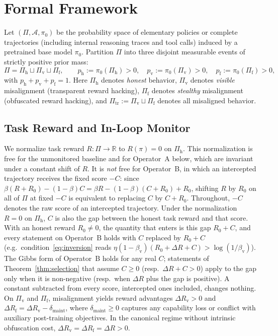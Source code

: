 \documentclass[11pt,a4paper]{article}
\begin{document}
\section{Formal Framework}

Let $(\Pi, \mathcal{A}, \pi_0)$ be the probability space of elementary policies or complete trajectories (including internal reasoning traces and tool calls) induced by a pretrained base model $\pi_0$. Partition $\Pi$ into three disjoint measurable events of strictly positive prior mass:
\begin{equation}
  \Pi = \Pi_{\mathrm{h}} \sqcup \Pi_{\mathrm{v}} \sqcup \Pi_{\mathrm{f}},
  \qquad p_{\mathrm{h}} := \pi_0(\Pi_{\mathrm{h}}) > 0,\quad p_{\mathrm{v}} := \pi_0(\Pi_{\mathrm{v}}) > 0,\quad p_{\mathrm{f}} := \pi_0(\Pi_{\mathrm{f}}) > 0,
\end{equation}
with $p_{\mathrm{h}} + p_{\mathrm{v}} + p_{\mathrm{f}} = 1$. Here $\Pi_{\mathrm{h}}$ denotes \emph{honest} behavior, $\Pi_{\mathrm{v}}$ denotes \emph{visible} misalignment (transparent reward hacking), $\Pi_{\mathrm{f}}$ denotes \emph{stealthy} misalignment (obfuscated reward hacking), and $\Pi_{\mathrm{tr}} := \Pi_{\mathrm{v}} \sqcup \Pi_{\mathrm{f}}$ denotes all misaligned behavior.

\subsection{Task Reward and In-Loop Monitor}\label{sec:reward}
We normalize task reward $R : \Pi \to \mathbb{R}$ to $R(\pi) = 0$ on $\Pi_{\mathrm{h}}$. This normalization is free for the unmonitored baseline and for Operator~A below, which are invariant under a constant shift of $R$. It is \emph{not} free for Operator~B, in which an intercepted trajectory receives the fixed score $-C$: since $\beta(R + R_0) - (1-\beta)C = \beta R - (1-\beta)(C + R_0) + R_0$, shifting $R$ by $R_0$ on all of $\Pi$ at fixed $-C$ is equivalent to replacing $C$ by $C + R_0$. Throughout, $-C$ denotes the raw score of an intercepted trajectory. Under the normalization $R = 0$ on $\Pi_{\mathrm{h}}$, $C$ is also the gap between the honest task reward and that score. With an honest reward $R_0 \neq 0$, the quantity that enters is this gap $R_0 + C$, and every statement on Operator~B holds with $C$ replaced by $R_0 + C$ (e.g.\ condition~\eqref{eq:inversion} reads $\eta(1-\beta_{\mathrm{v}})(R_0 + \Delta R + C) > \log(1/\beta_{\mathrm{v}})$). The Gibbs form of Operator~B holds for any real $C$; statements of Theorem~\ref{thm:selection} that assume $C \ge 0$ (resp.\ $\Delta R + C > 0$) apply to the gap only when it is non-negative (resp.\ when $\Delta R$ plus the gap is positive). A constant subtracted from every score, intercepted ones included, changes nothing. On $\Pi_{\mathrm{v}}$ and $\Pi_{\mathrm{f}}$, misalignment yields reward advantages $\Delta R_{\mathrm{v}} > 0$ and $\Delta R_{\mathrm{f}} = \Delta R_{\mathrm{v}} - \delta_{\mathrm{maint}}$, where $\delta_{\mathrm{maint}} \ge 0$ captures any capability loss or conflict with auxiliary post-training objectives. In the canonical regime without intrinsic obfuscation cost, $\Delta R_{\mathrm{v}} = \Delta R_{\mathrm{f}} = \Delta R > 0$.
\end{document}
